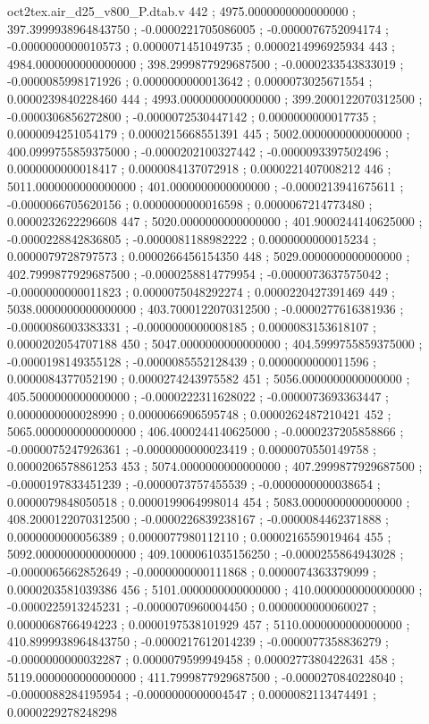 \begin{filecontents}[overwrite]{oct2tex.air_d25_v800_P.dtab.v}
442 ; 4975.0000000000000000 ; 397.3999938964843750 ; -0.0000221705086005 ; -0.0000076752094174 ; -0.0000000000010573 ; 0.0000071451049735 ; 0.0000214996925934
443 ; 4984.0000000000000000 ; 398.2999877929687500 ; -0.0000233543833019 ; -0.0000085998171926 ; 0.0000000000013642 ; 0.0000073025671554 ; 0.0000239840228460
444 ; 4993.0000000000000000 ; 399.2000122070312500 ; -0.0000306856272800 ; -0.0000072530447142 ; 0.0000000000017735 ; 0.0000094251054179 ; 0.0000215668551391
445 ; 5002.0000000000000000 ; 400.0999755859375000 ; -0.0000202100327442 ; -0.0000093397502496 ; 0.0000000000018417 ; 0.0000084137072918 ; 0.0000221407008212
446 ; 5011.0000000000000000 ; 401.0000000000000000 ; -0.0000213941675611 ; -0.0000066705620156 ; 0.0000000000016598 ; 0.0000067214773480 ; 0.0000232622296608
447 ; 5020.0000000000000000 ; 401.9000244140625000 ; -0.0000228842836805 ; -0.0000081188982222 ; 0.0000000000015234 ; 0.0000079728797573 ; 0.0000266456154350
448 ; 5029.0000000000000000 ; 402.7999877929687500 ; -0.0000258814779954 ; -0.0000073637575042 ; -0.0000000000011823 ; 0.0000075048292274 ; 0.0000220427391469
449 ; 5038.0000000000000000 ; 403.7000122070312500 ; -0.0000277616381936 ; -0.0000086003383331 ; -0.0000000000008185 ; 0.0000083153618107 ; 0.0000202054707188
450 ; 5047.0000000000000000 ; 404.5999755859375000 ; -0.0000198149355128 ; -0.0000085552128439 ; 0.0000000000011596 ; 0.0000084377052190 ; 0.0000274243975582
451 ; 5056.0000000000000000 ; 405.5000000000000000 ; -0.0000222311628022 ; -0.0000073693363447 ; 0.0000000000028990 ; 0.0000066906595748 ; 0.0000262487210421
452 ; 5065.0000000000000000 ; 406.4000244140625000 ; -0.0000237205858866 ; -0.0000075247926361 ; -0.0000000000023419 ; 0.0000070550149758 ; 0.0000206578861253
453 ; 5074.0000000000000000 ; 407.2999877929687500 ; -0.0000197833451239 ; -0.0000073757455539 ; -0.0000000000038654 ; 0.0000079848050518 ; 0.0000199064998014
454 ; 5083.0000000000000000 ; 408.2000122070312500 ; -0.0000226839238167 ; -0.0000084462371888 ; 0.0000000000056389 ; 0.0000077980112110 ; 0.0000216559019464
455 ; 5092.0000000000000000 ; 409.1000061035156250 ; -0.0000255864943028 ; -0.0000065662852649 ; -0.0000000000111868 ; 0.0000074363379099 ; 0.0000203581039386
456 ; 5101.0000000000000000 ; 410.0000000000000000 ; -0.0000225913245231 ; -0.0000070960004450 ; 0.0000000000060027 ; 0.0000068766494223 ; 0.0000197538101929
457 ; 5110.0000000000000000 ; 410.8999938964843750 ; -0.0000217612014239 ; -0.0000077358836279 ; -0.0000000000032287 ; 0.0000079599949458 ; 0.0000277380422631
458 ; 5119.0000000000000000 ; 411.7999877929687500 ; -0.0000270840228040 ; -0.0000088284195954 ; -0.0000000000004547 ; 0.0000082113474491 ; 0.0000229278248298

\end{filecontents}

